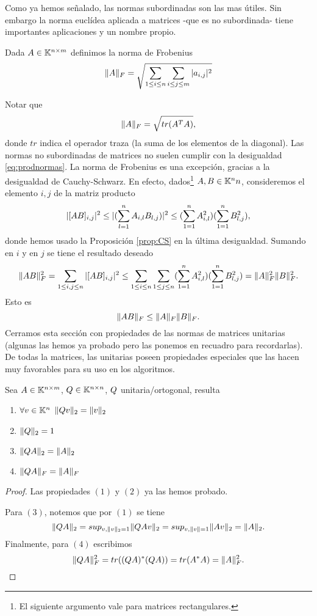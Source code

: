 Como ya hemos señalado, las normas subordinadas son las mas útiles. Sin embargo la norma euclídea aplicada a matrices -que es no subordinada- tiene importantes aplicaciones y un nombre propio.
\tccdefi
\begin{defi}
 Dada $\Ab\in \K^{n\times m}$ definimos la norma de Frobenius
 $$
 \|\Ab\|_F=\sqrt{\sum_{1\le i\le n}\sum_{i\le j\le m} |a_{i,j}|^2}
 $$
\end{defi}
\etcc
Notar que
$$
\|\Ab\|_F=\sqrt{tr(\Ab^T\Ab)},
$$
donde $tr$ indica el operador traza (la suma de los elementos de la diagonal). Las normas no subordinadas de matrices no suelen cumplir con la desigualdad \eqref{eq:prodnormas}. La norma de Frobenius es una excepción, gracias a la desigualdad de Cauchy-Schwarz. En efecto, dados\footnote{El siguiente argumento vale para matrices rectangulares.}
$\Ab,\Bb\in \K^nn$, consideremos el elemento $i,j$ de la  matriz producto
$$
|[\Ab\Bb]_{i,j}|^2\le |(\sum_{l=1}^n\Ab_{i,l}\Bb_{l,j})|^2\le (\sum_{1=1}^n\Ab_{i,l}^2)(\sum_{1=1}^n\Bb_{l,j}^2),
$$
donde hemos usado la Proposición \ref{prop:CS} en la última desigualdad. Sumando en $i$ y en $j$ se tiene el resultado deseado
$$
\|\Ab\Bb\|_F^2=\sum_{1\le i,j\le n}|[\Ab\Bb]_{i,j}|^2\le\sum_{1\le i\le n}\sum_{1\le j\le n}(\sum_{1=1}^n\Ab_{i,l}^2)(\sum_{1=1}^n\Bb_{l,j}^2)=
\|\Ab\|_F^2\|\Bb\|_F^2.
$$
Esto es
\tcc
$$\|\Ab\Bb\|_F\le \|\Ab\|_F\|\Bb\|_F.$$
\etcc
Cerramos esta sección con propiedades de las normas de matrices unitarias (algunas las hemos ya probado pero las ponemos en recuadro para recordarlas).
De todas la matrices, las unitarias poseen propiedades especiales que las hacen muy favorables para su uso en los algoritmos.
\tcc
\begin{prop}
 \label{prop:unitarias}
 Sea $\Ab\in \K^{n\times m}$, $\Qb\in \Knn$, $\Qb$ unitaria/ortogonal, resulta
 \begin{enumerate}
  \item $\forall \vb\in \Kn$
  $\|\Qb\vb\|_{2}=\|\vb\|_2$
  \item $\|\Qb\|_{2}=1$
  \item $\|\Qb\Ab\|_2=\|\Ab\|_2$
  \item $\|\Qb\Ab\|_F=\|\Ab\|_F$
 \end{enumerate}
\end{prop}
\etcc
\begin{proof} Las propiedades $(1)$ y $(2)$ ya las hemos probado.

Para $(3)$, notemos que por $(1)$ se tiene
 $$\|\Qb\Ab \|_{2}=sup_{\vb, \|\vb\|_2=1}
 \|\Qb\Ab \vb\|_{2}=sup_{\vb, \|\vb\|=1}\|\Ab\vb\|_2=\|\Ab\|_2.
 $$
 Finalmente, para $(4)$ escribimos
 $$
 \|\Qb\Ab\|_F^2=tr((\Qb\Ab)^*(\Qb\Ab))=tr(\Ab^*\Ab)=\|\Ab\|_F^2.
 $$\end{proof}

